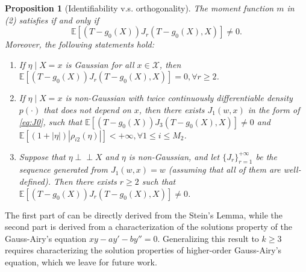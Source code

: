 \documentclass{article}
\def\gX{{\mathcal{X}}}
\newcommand{\E}{\mathbb{E}}
\newtheorem{proposition}{Proposition}[section]
\newcommand{\ind}{\perp\!\!\!\!\perp}
\begin{document}
\begin{proposition}[Identifiability v.s. orthogonality]
    \label{prop:asmp-suff-cond}
    The moment function $m$ in   (2) satisfies   if and only if $$\E\left[(T-g_0(X))J_r(T-g_0(X),X)\right]\neq 0.$$ Moreover, the following statements hold:
    \begin{enumerate}[(1).]
        \item If $\eta\mid X=x$ is Gaussian for all $x\in\gX$, then $\E\left[(T-g_0(X))J_r(T-g_0(X),X)\right]= 0, \forall r\geq 2$.
        \item If $\eta\mid X=x$ is non-Gaussian with twice continuously differentiable density $p(\cdot)$ that does not depend on $x$, then there exists $J_1(w,x)$ in the form of \eqref{eq:J0}, such that $\E[(T-g_0(X))J_3(T-g_0(X),X)]\neq 0$ and $\E[(1+|\eta|)|\rho_{i2}(\eta)|] < +\infty, \forall 1\leq i\leq M_2$. 
        \item Suppose that $\eta\ind X$ and $\eta$ is non-Gaussian, and let $\{J_r\}_{r=1}^{+\infty}$ be the sequence generated from $J_1(w,x)=w$ (assuming that all of them are well-defined). Then there exists $r \geq 2$ such that $\E[(T-g_0(X))J_r(T-g_0(X),X)]\neq 0$.
    \end{enumerate}
\end{proposition}

The first part of    can be directly derived from the Stein's Lemma, while the second part is derived from a characterization of the solutions property of the Gauss-Airy's equation $xy - ay' - by'' = 0.$ \citep{durugo2014higher,ansari2016gauss}
Generalizing this result to $k\geq 3$ requires characterizing the solution properties of higher-order Gauss-Airy's equation, which we leave for future work.
\end{document}
